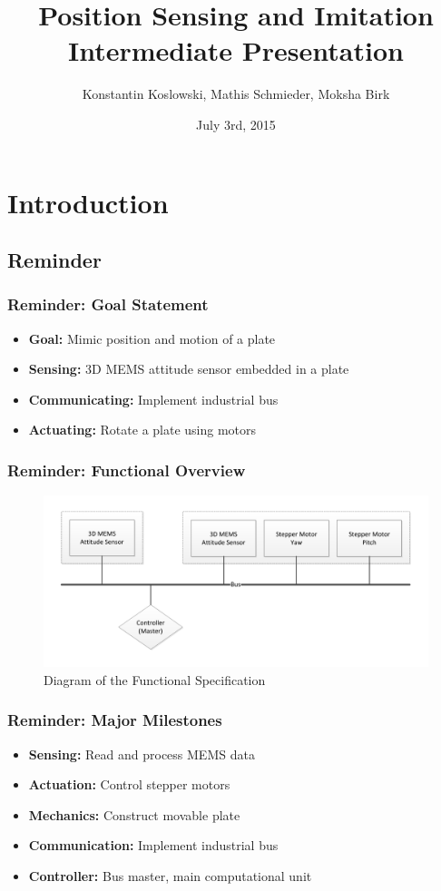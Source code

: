 \documentclass{beamer}
\title[NES Project: Intermediate Presentation]{Position Sensing and Imitation\\Intermediate Presentation}
\author[Koslowski, Schmieder, Birk]{Konstantin Koslowski, Mathis Schmieder, Moksha Birk}
\institute[]
{TU Berlin \\
 Department of Telecommunication Systems \\
 Telecommunication Networks Group \\
}
\date{July 3rd, 2015}
\begin{document}
\begin{frame}
  \titlepage
\end{frame}

\section{Introduction}
\subsection{Reminder}

\begin{frame}
  \frametitle{Reminder: Goal Statement}
  \begin{itemize}
    \item \textbf{Goal:} Mimic position and motion of a plate
    \vfill
    \item \textbf{Sensing:} 3D MEMS attitude sensor embedded in a plate
    \item \textbf{Communicating:} Implement industrial bus
    \item \textbf{Actuating:} Rotate a plate using motors
  \end{itemize}
\end{frame}

\begin{frame}
  \frametitle{Reminder: Functional Overview}
\begin{figure}
\includegraphics[width=\textwidth]{functionalspecification.pdf}
\caption{Diagram of the Functional Specification}
\end{figure}
\end{frame}

\begin{frame}
  \frametitle{Reminder: Major Milestones}
  \begin{itemize}
    \item \textbf{Sensing:} Read and process MEMS data\\
    \item \textbf{Actuation:} Control stepper motors\\
    \item \textbf{Mechanics:} Construct movable plate\\
    \item \textbf{Communication:} Implement industrial bus\\
    \item \textbf{Controller:} Bus master, main computational unit\\
  \end{itemize}
\end{frame}
\end{document}
